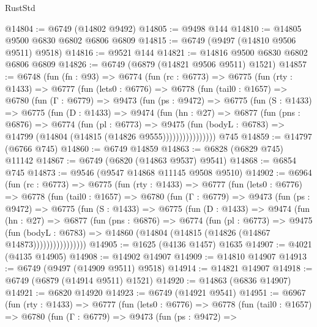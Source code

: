 \begin{lexlean}{RustStd}
\begin{coremodule}
@14804 := @6749 (@14802 @9492)
@14805 := @9498 @144
@14810 := @14805 @9500 @6830 @6802 @6806 @6809
@14815 := @6749 (@9497 (@14810 @9506 @9511) @9518)
@14816 := @9521 @144
@14821 := @14816 @9500 @6830 @6802 @6806 @6809
@14826 := @6749 (@6879 (@14821 @9506 @9511) @1521)
@14857 := @6748
    (fun (fn : @93) =>
    @6774
      (fun (rc : @6773) =>
      @6775
        (fun (rty : @1433) =>
        @6777
          (fun (lets0 : @6776) =>
          @6778
            (fun (tail0 : @1657) =>
            @6780
              (fun (Γ : @6779) =>
              @9473
                (fun (ps : @9472) =>
                @6775
                  (fun (S : @1433) =>
                  @6775
                    (fun (D : @1433) =>
                    @9474
                      (fun (hn : @27) =>
                      @6877
                        (fun (pns : @6876) =>
                        @6774
                          (fun (pl : @6773) =>
                          @9475
                            (fun (bodyL : @6783) =>
                            @14799 (@14804 (@14815 (@14826 @9555))))))))))))))))
    @745
@14859 := @14797 (@6766 @745)
@14860 := @6749 @14859
@14863 := @6828 (@6829 @745) @11142
@14867 := @6749 (@6820 (@14863 @9537) @9541)
@14868 := @6854 @745
@14873 := @9546 (@9547 @14868 @11145 @9508 @9510)
@14902 := @6964
    (fun (rc : @6773) =>
    @6775
      (fun (rty : @1433) =>
      @6777
        (fun (lets0 : @6776) =>
        @6778
          (fun (tail0 : @1657) =>
          @6780
            (fun (Γ : @6779) =>
            @9473
              (fun (ps : @9472) =>
              @6775
                (fun (S : @1433) =>
                @6775
                  (fun (D : @1433) =>
                  @9474
                    (fun (hn : @27) =>
                    @6877
                      (fun (pns : @6876) =>
                      @6774
                        (fun (pl : @6773) =>
                        @9475
                          (fun (bodyL : @6783) =>
                          @14860 (@14804 (@14815 (@14826 (@14867 @14873))))))))))))))))
@14905 := @1625 (@4136 @1457) @1635
@14907 := @4021 (@4135 @14905)
@14908 := @14902 @14907
@14909 := @14810 @14907
@14913 := @6749 (@9497 (@14909 @9511) @9518)
@14914 := @14821 @14907
@14918 := @6749 (@6879 (@14914 @9511) @1521)
@14920 := @14863 (@6836 @14907)
@14921 := @6820 @14920
@14923 := @6749 (@14921 @9541)
@14951 := @6967
    (fun (rty : @1433) =>
    @6777
      (fun (lets0 : @6776) =>
      @6778
        (fun (tail0 : @1657) =>
        @6780
          (fun (Γ : @6779) =>
          @9473
            (fun (ps : @9472) =>

\end{coremodule}
\end{lexlean}

